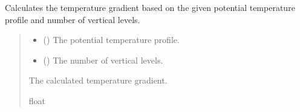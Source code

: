 \documentclass[a4paper,11pt,english,openany]{sphinxmanual}
\begin{document}
\begin{fulllineitems}
\label{\detokenize{api/spyice.preprocess.initial_boundary_conditions:spyice.preprocess.initial_boundary_conditions.temperature_gradient}}
\pysigstartsignatures
{}
\pysigstopsignatures
\sphinxAtStartPar
Calculates the temperature gradient based on the given potential temperature profile and number of vertical levels.
\begin{quote}\begin{description}
\begin{itemize}
\item {} 
\sphinxAtStartPar
{} () \textendash{} The potential temperature profile.

\item {} 
\sphinxAtStartPar
{} () \textendash{} The number of vertical levels.

\end{itemize}

\sphinxAtStartPar
The calculated temperature gradient.

\sphinxAtStartPar
float

\sphinxAtStartPar
{} \textendash{} 

\end{description}\end{quote}

\end{fulllineitems}


\sphinxstepscope
{}\label{\detokenize{api/spyice.preprocess.modify_initial_boundary:module-spyice.preprocess.modify_initial_boundary}}
\end{document}
